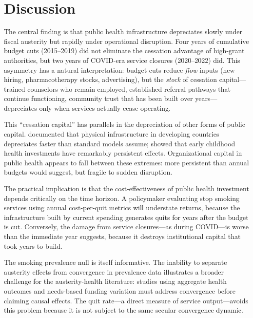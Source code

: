 \documentclass[12pt]{article}
\begin{document}


\section{Discussion}

The central finding is that public health infrastructure depreciates slowly under fiscal austerity but rapidly under operational disruption. Four years of cumulative budget cuts (2015--2019) did not eliminate the cessation advantage of high-grant authorities, but two years of COVID-era service closures (2020--2022) did. This asymmetry has a natural interpretation: budget cuts reduce \textit{flow} inputs (new hiring, pharmacotherapy stocks, advertising), but the \textit{stock} of cessation capital---trained counselors who remain employed, established referral pathways that continue functioning, community trust that has been built over years---depreciates only when services actually cease operating.

This ``cessation capital'' has parallels in the depreciation of other forms of public capital. \citet{pritchett2000patterns} documented that physical infrastructure in developing countries depreciates faster than standard models assume; \citet{currie2020child} showed that early childhood health investments have remarkably persistent effects. Organizational capital in public health appears to fall between these extremes: more persistent than annual budgets would suggest, but fragile to sudden disruption.

The practical implication is that the cost-effectiveness of public health investment depends critically on the time horizon. A policymaker evaluating stop smoking services using annual cost-per-quit metrics will understate returns, because the infrastructure built by current spending generates quits for years after the budget is cut. Conversely, the damage from service closures---as during COVID---is worse than the immediate year suggests, because it destroys institutional capital that took years to build.

The smoking prevalence null is itself informative. The inability to separate austerity effects from convergence in prevalence data illustrates a broader challenge for the austerity-health literature: studies using aggregate health outcomes and needs-based funding variation must address convergence before claiming causal effects. The quit rate---a direct measure of service output---avoids this problem because it is not subject to the same secular convergence dynamic.
\end{document}
